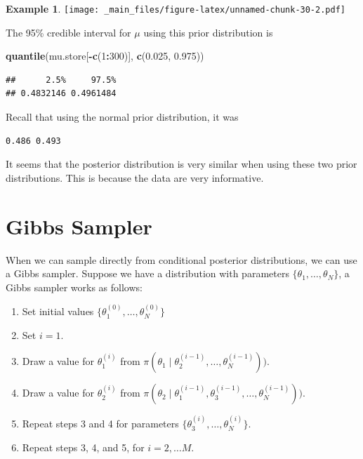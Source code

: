 \documentclass[
]{book}
\newenvironment{Shaded}{\begin{snugshade}}{\end{snugshade}}
\newcommand{\DecValTok}[1]{\textcolor[rgb]{0.00,0.00,0.81}{#1}}
\newcommand{\FloatTok}[1]{\textcolor[rgb]{0.00,0.00,0.81}{#1}}
\newcommand{\FunctionTok}[1]{\textcolor[rgb]{0.13,0.29,0.53}{\textbf{#1}}}
\newcommand{\NormalTok}[1]{#1}
\newcommand{\SpecialCharTok}[1]{\textcolor[rgb]{0.81,0.36,0.00}{\textbf{#1}}}
\theoremstyle{definition}
\theoremstyle{definition}
\newtheorem{example}{Example}[chapter]
\theoremstyle{definition}
\theoremstyle{definition}
\theoremstyle{remark}
\begin{document}
\begin{example}
\texttt{[image: \_main\_files/figure-latex/unnamed-chunk-30-2.pdf]}

The 95\% credible interval for \(\mu\) using this prior distribution is

\begin{Shaded}
\begin{Highlighting}[]
\FunctionTok{quantile}\NormalTok{(mu.store[}\SpecialCharTok{{-}}\FunctionTok{c}\NormalTok{(}\DecValTok{1}\SpecialCharTok{:}\DecValTok{300}\NormalTok{)], }\FunctionTok{c}\NormalTok{(}\FloatTok{0.025}\NormalTok{, }\FloatTok{0.975}\NormalTok{))}
\end{Highlighting}
\end{Shaded}

\begin{verbatim}
##      2.5%     97.5% 
## 0.4832146 0.4961484
\end{verbatim}

Recall that using the normal prior distribution, it was

\begin{verbatim}
0.486 0.493
\end{verbatim}

It seems that the posterior distribution is very similar when using these two prior distributions. This is because the data are very informative.
\end{example}

\hypertarget{gibbs-sampler}{%
\section{Gibbs Sampler}\label{gibbs-sampler}}

When we can sample directly from conditional posterior distributions, we can use a Gibbs sampler. Suppose we have a distribution with parameters \(\{\theta_1, \ldots, \theta_N\}\), a Gibbs sampler works as follows:

\begin{enumerate}
\def\labelenumi{\arabic{enumi}.}
\item
  Set initial values \(\{\theta_1^{(0)}, \ldots, \theta_N^{(0)}\}\)
\item
  Set \(i = 1\).
\item
  Draw a value for \(\theta_1^{(i)}\) from \(\pi(\theta_1 \mid \theta_2^{(i-1)}, \ldots, \theta_N^{(i-1)}))\).
\item
  Draw a value for \(\theta_2^{(i)}\) from \(\pi(\theta_2 \mid \theta_1^{(i-1)}, \theta_3^{(i-1)}, \ldots, \theta_N^{(i-1)}))\).
\item
  Repeat steps 3 and 4 for parameters \(\{\theta_3^{(i)}, \ldots, \theta_N^{(i)}\}\).
\item
  Repeat steps 3, 4, and 5, for \(i = 2, \ldots M\).
\end{enumerate}
\end{document}

